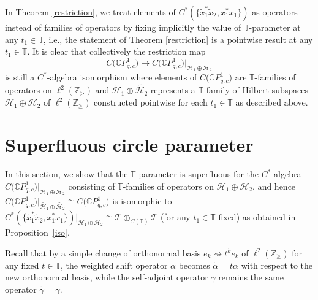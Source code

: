In Theorem \ref{restriction}, we treat elements of $C^{\ast} ( \{ \tilde{x}%
_{1}^{\ast}\tilde{x}_{2},x_{1}^{\ast}x_{1} \} ) $ as operators
instead of families of operators by fixing implicitly the value of
$\mathbb{T}$-parameter at any $t_{1}\in\mathbb{T}$, i.e., the statement of
Theorem \ref{restriction} is a pointwise result at any $t_{1}\in\mathbb{T}$. It is clear that
collectively the restriction map
\[
C\big(\mathbb{C}P_{q,c}^{1}\big) \rightarrow C\big( \mathbb{C}
P_{q,c}^{1}\big) \big|_{\widetilde{\mathcal{H}_{1}}\oplus\widetilde{\mathcal{H}_{2}}}
\]
is still a $C^*$-algebra isomorphism where elements of $C\big( \mathbb{C}P_{q,c}^{1}\big) $ are $\mathbb{T}$-families of operators on $\ell^{2} ( \mathbb{Z}_{\geq} ) $ and $\widetilde{\mathcal{H}_{1}}\oplus\widetilde{\mathcal{H}_{2}}$ represents a $\mathbb{T}$-family of Hilbert subspaces $\mathcal{H}_{1}\oplus\mathcal{H}_{2}$ of $\ell^{2} (\mathbb{Z}_{\geq} ) $ constructed pointwise for each $t_{1}\in \mathbb{T}$ as described above.

\section{Superfluous circle parameter}

In this section, we show that the $\mathbb{T}$-parameter is superfluous for
the $C^*$-algebra $C\big( \mathbb{C}P_{q,c}^{1}\big)
\big|_{\widetilde{\mathcal{H}_{1}}\oplus\widetilde{\mathcal{H}_{2}}}$ consisting
of $\mathbb{T}$-families of operators on $\mathcal{H}_{1}\oplus\mathcal{H}%
_{2}$, and hence $C\big(\mathbb{C}P_{q,c}^{1}\big)
|_{\widetilde{\mathcal{H}_{1}}\oplus\widetilde{\mathcal{H}_{2}}}\cong C\big(
\mathbb{C}P_{q,c}^{1}\big) $ is isomorphic to $C^{\ast} ( \{
\tilde{x}_{1}^{\ast}\tilde{x}_{2},x_{1}^{\ast}x_{1} \} )
|_{\mathcal{H}_{1}\oplus\mathcal{H}_{2}}\cong\mathcal{T}\oplus_{C (
\mathbb{T} ) }\mathcal{T}$ (for any $t_{1}\in\mathbb{T}$ fixed) as
obtained in Proposition~\ref{iso}.

Recall that by a simple change of orthonormal basis $e_{k}\rightsquigarrow
t^{k}e_{k}$ of $\ell^{2} ( \mathbb{Z}_{\geq} ) $ for any fixed
$t\in\mathbb{T}$, the weighted shift operator $\alpha$ becomes $\tilde{\alpha
}=t\alpha$ with respect to the new orthonormal basis, while the self-adjoint
operator $\gamma$ remains the same operator $\tilde{\gamma}=\gamma$.

